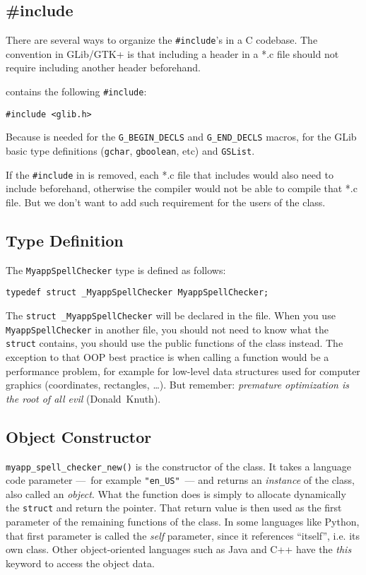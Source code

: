 \subsection{\#include}
\label{oop-semi-include-in-header}
There are several ways to organize the \lstinline{#include}'s in a C codebase. The convention in GLib/GTK+ is that including a header in a *.c file should not require including another header beforehand.

 contains the following \lstinline{#include}:
\begin{lstlisting}
#include <glib.h>
\end{lstlisting}

Because  is needed for the \lstinline{G_BEGIN_DECLS} and \lstinline{G_END_DECLS} macros, for the GLib basic type definitions (\lstinline{gchar}, \lstinline{gboolean}, etc) and \lstinline{GSList}.

If the \lstinline{#include} in  is removed, each *.c file that includes  would also need to include  beforehand, otherwise the compiler would not be able to compile that *.c file. But we don't want to add such requirement for the users of the class.

\subsection{Type Definition}
The \lstinline{MyappSpellChecker} type is defined as follows:

\begin{lstlisting}
typedef struct _MyappSpellChecker MyappSpellChecker;
\end{lstlisting}

The \lstinline{struct _MyappSpellChecker} will be declared in the  file. When you use \lstinline{MyappSpellChecker} in another file, you should not need to know what the \lstinline{struct} contains, you should use the public functions of the class instead. The exception to that OOP best practice is when calling a function would be a performance problem, for example for low-level data structures used for computer graphics (coordinates, rectangles, …). But remember: \emph{premature optimization is the root of all evil} (Donald~Knuth).

\subsection{Object Constructor}
\lstinline{myapp_spell_checker_new()} is the constructor of the class. It takes a language code parameter ---~for example \lstinline{"en_US"}~--- and returns an \emph{instance} of the class, also called an \emph{object}. What the function does is simply to allocate dynamically the \lstinline{struct} and return the pointer. That return value is then used as the first parameter of the remaining functions of the class. In some languages like Python, that first parameter is called the \emph{self} parameter, since it references ``itself'', i.e. its own class. Other object-oriented languages such as Java and C++ have the \emph{this} keyword to access the object data.

